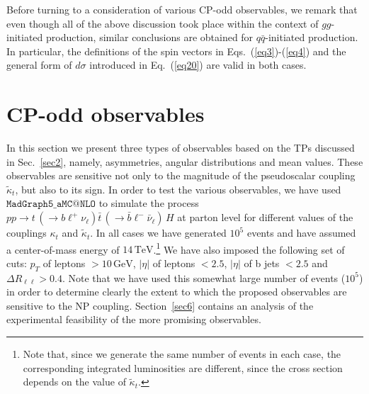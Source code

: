 \documentclass[aps,preprint,tightenlines,floatfix,superscriptaddress,nofootinbib,showpacs]{revtex4-1}
\def\tbar{\bar{t}}
\def\bbar{\bar{b}}
\def\qbar{\bar{q}}
\def\nubar{{\bar{\nu}}_{\ell}}
\def\ppprocess{pp\to t\,\left(\rightarrow b {\ell}^+ \nu_{\ell}\right) \tbar\,\left(\rightarrow\bbar {\ell}^-\nubar\right)\,H}
\def\kp{\kappa_t}
\def\kpt{\tilde{\kappa}_t}
\begin{document}
Before turning to a consideration of various CP-odd observables,
we remark that even though all of the above discussion took place
within the context of $gg$-initiated production, similar conclusions
are obtained for $q\qbar$-initiated production. In particular, the
definitions of the spin vectors in Eqs.~(\ref{eq3})-(\ref{eq4}) and
the general form of $d\sigma$ introduced in Eq.~(\ref{eq20}) are valid
in both cases.
\bigskip
\section{$\mathrm{\mathbf{CP}}$-odd observables}
\label{sec3}
In this section we present three types of observables based on the TPs discussed
in Sec.~\ref{sec2}, namely, asymmetries, angular
distributions and mean values. These observables are sensitive not only to the
magnitude of the pseudoscalar coupling $\kpt$, but also to its
sign.  In order to test the various observables, we have
used $\mathtt{MadGraph5\_aMC@NLO}$ \cite{Madgraph} to simulate the process
$\ppprocess$ at parton level for different values of the couplings
$\kp$ and $\kpt$.  In all cases we have generated $10^5$ events
and have assumed a center-of-mass energy of
$14\,\mathrm{TeV}$.\footnote{Note that, since we generate
  the same number of events in
  each case, the corresponding integrated luminosities are different, since the
  cross section depends on the value of $\kpt$.}
We have also imposed the
following set of cuts: $p_T$ of leptons $> 10\,\mathrm{GeV}$, $|\eta|$
of leptons $< 2.5$, $|\eta|$ of b jets $< 2.5$ and $\Delta
R_{\ell\ell}>0.4$.  Note that we have used this
somewhat large number of events ($10^5$) in order to determine clearly
the extent to which the proposed observables are sensitive to the NP
coupling.  Section~\ref{sec6} contains an
analysis of the experimental feasibility of the more promising observables.
\end{document}

